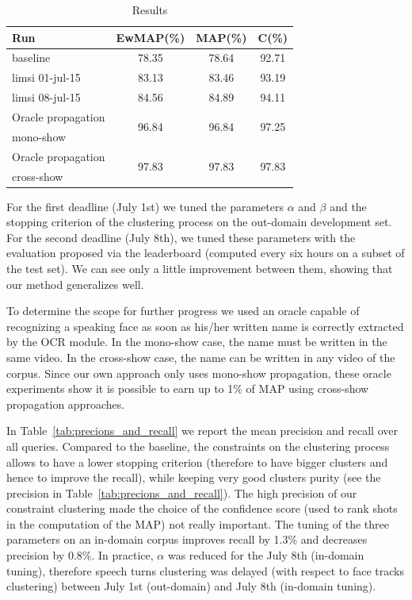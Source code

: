 \documentclass{acm_proc_article-me}
\begin{document}
\begin{table}[ht]
  \centering
  \begin{tabular}{|l|c|c|c|}
    \hline
	Run 											& EwMAP(\%)	& MAP(\%)	& C(\%) \\
	\hline
	\hline
	baseline										& 78.35		& 78.64		& 92.71		\\
	\hline
	limsi 01-jul-15 								& 83.13		& 83.46		& 93.19		\\
	limsi 08-jul-15 								& 84.56		& 84.89		& 94.11		\\
	\hline
	\hline
	Oracle propagation 	& \multirow{2}{*}{96.84}		& \multirow{2}{*}{96.84}		& \multirow{2}{*}{97.25}	\\
	mono-show			&							&							&			\\
	\hline
	Oracle propagation 	& \multirow{2}{*}{97.83}		& \multirow{2}{*}{97.83}		& \multirow{2}{*}{97.83}	\\
	cross-show 			&							&							&			\\
  	\hline
  \end{tabular}
  \caption{Results}
  \label{tab:results}
\end{table}

For the first deadline (July 1st) we tuned the parameters $\alpha$ and $\beta$ and the stopping criterion of the clustering process on the out-domain development set. For the second deadline (July 8th), we tuned these parameters with the evaluation proposed via the leaderboard (computed every six hours on a subset of the test set). We can see only a little improvement between them, showing that our method generalizes well.

To determine the scope for further progress we used an oracle capable of recognizing a speaking face as soon as his/her written name is correctly extracted by the OCR module. In the mono-show case, the name must be written in the same video. In the cross-show case, the name can be written in any video of the corpus. Since our own approach only uses mono-show propagation, these oracle experiments show it is possible to earn up to 1\% of MAP using cross-show propagation approaches.

In Table~\ref{tab:precions_and_recall} we report the mean precision and recall over all queries. Compared to the baseline, the constraints on the clustering process allows to have a lower stopping criterion (therefore to have bigger clusters and hence to improve the recall), while keeping very good clusters purity (see the precision in Table~\ref{tab:precions_and_recall}). The high precision of our constraint clustering made the choice of the confidence score (used to rank shots in the computation of the MAP) not really important. The tuning of the three parameters on an in-domain corpus improves recall by 1.3\% and decreases precision by 0.8\%. In practice, $\alpha$ was reduced for the July 8th (in-domain tuning), therefore speech turns clustering was delayed (with respect to face tracks clustering) between July 1st (out-domain) and July 8th (in-domain tuning).
\end{document}
